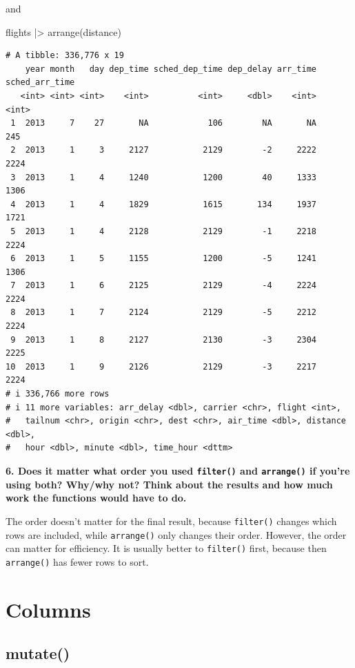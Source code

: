 \documentclass[
  letterpaper,
  DIV=11,
  numbers=noendperiod]{scrreprt}
\newenvironment{Shaded}{\begin{snugshade}}{\end{snugshade}}
\newcommand{\FunctionTok}[1]{\textcolor[rgb]{0.28,0.35,0.67}{#1}}
\newcommand{\NormalTok}[1]{\textcolor[rgb]{0.00,0.23,0.31}{#1}}
\newcommand{\SpecialCharTok}[1]{\textcolor[rgb]{0.37,0.37,0.37}{#1}}
\begin{document}
and

\begin{Shaded}
\begin{Highlighting}[]
\NormalTok{flights }\SpecialCharTok{|\textgreater{}}
  \FunctionTok{arrange}\NormalTok{(distance)}
\end{Highlighting}
\end{Shaded}

\begin{verbatim}
# A tibble: 336,776 x 19
    year month   day dep_time sched_dep_time dep_delay arr_time sched_arr_time
   <int> <int> <int>    <int>          <int>     <dbl>    <int>          <int>
 1  2013     7    27       NA            106        NA       NA            245
 2  2013     1     3     2127           2129        -2     2222           2224
 3  2013     1     4     1240           1200        40     1333           1306
 4  2013     1     4     1829           1615       134     1937           1721
 5  2013     1     4     2128           2129        -1     2218           2224
 6  2013     1     5     1155           1200        -5     1241           1306
 7  2013     1     6     2125           2129        -4     2224           2224
 8  2013     1     7     2124           2129        -5     2212           2224
 9  2013     1     8     2127           2130        -3     2304           2225
10  2013     1     9     2126           2129        -3     2217           2224
# i 336,766 more rows
# i 11 more variables: arr_delay <dbl>, carrier <chr>, flight <int>,
#   tailnum <chr>, origin <chr>, dest <chr>, air_time <dbl>, distance <dbl>,
#   hour <dbl>, minute <dbl>, time_hour <dttm>
\end{verbatim}

\textbf{6. Does it matter what order you used \texttt{filter()} and
\texttt{arrange()} if you're using both? Why/why not? Think about the
results and how much work the functions would have to do.}

The order doesn't matter for the final result, because \texttt{filter()}
changes which rows are included, while \texttt{arrange()} only changes
their order. However, the order can matter for efficiency. It is usually
better to \texttt{filter()} first, because then \texttt{arrange()} has
fewer rows to sort.

\section{Columns}\label{columns}

\subsection{mutate()}\label{mutate}
\end{document}
